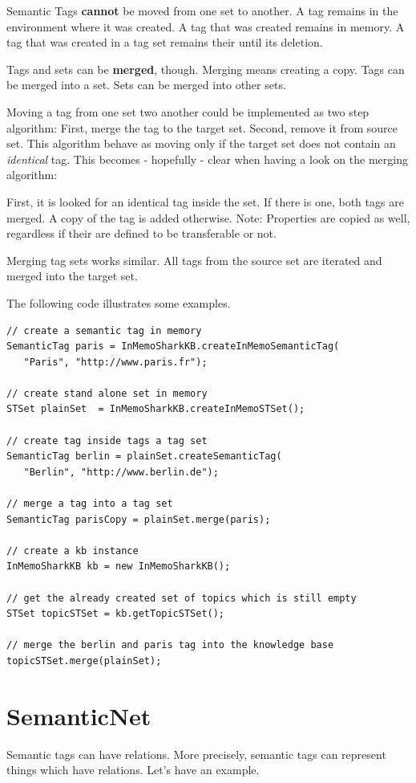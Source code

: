 Semantic Tags {\bf cannot} be moved from one set to another. A tag remains in the environment where it was created. A tag that was created remains in memory. A tag that was created in a tag set remains their until its deletion. 

Tags and sets can be {\bf merged}, though. Merging means creating a copy.
Tags can be merged into a set. Sets can be merged into other sets.

Moving a tag from one set two another could be implemented as two step algorithm: First, merge the tag to the target set. Second, remove it from source set. This algorithm behave as moving only if the target set does not contain an {\it identical} tag. This becomes - hopefully - clear when having a look on the merging algorithm:

First, it is looked for
an identical tag inside the set. If there is one, both tags are merged. A copy of the tag is added otherwise. Note: Properties are copied as well, regardless if their are defined to be transferable or not.

Merging tag sets works similar. All tags from the source set are iterated and merged into the target set.

The following code illustrates some examples.

\begin{verbatim}
// create a semantic tag in memory
SemanticTag paris = InMemoSharkKB.createInMemoSemanticTag(
   "Paris", "http://www.paris.fr");

// create stand alone set in memory
STSet plainSet  = InMemoSharkKB.createInMemoSTSet();

// create tag inside tags a tag set
SemanticTag berlin = plainSet.createSemanticTag(
   "Berlin", "http://www.berlin.de");

// merge a tag into a tag set
SemanticTag parisCopy = plainSet.merge(paris);

// create a kb instance
InMemoSharkKB kb = new InMemoSharkKB();

// get the already created set of topics which is still empty 
STSet topicSTSet = kb.getTopicSTSet();

// merge the berlin and paris tag into the knowledge base
topicSTSet.merge(plainSet);
\end{verbatim}

\section{SemanticNet}
Semantic tags can have relations. More precisely, semantic tags can represent things which have relations. Let's have an example.

